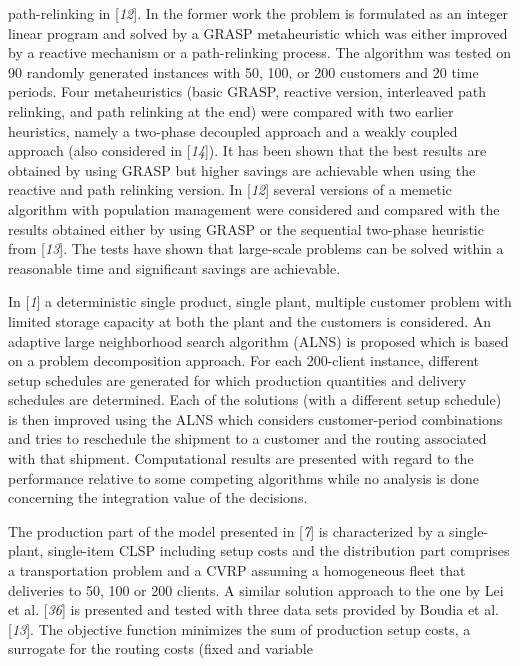  path-relinking in [\textit{12}]. In the former work the
 problem is formulated as an integer linear program and solved by a GRASP
 metaheuristic which was either improved by a reactive mechanism or a path-relinking
 process. The algorithm was tested on 90 randomly generated instances with 50, 100, or
 200 customers and 20 time periods. Four metaheuristics (basic GRASP, reactive
 version, interleaved path relinking, and path relinking at the end) were compared
 with two earlier heuristics, namely a two-phase decoupled approach and a weakly
 coupled approach (also considered in [\textit{14}]). It
 has been shown that the best results are obtained by using GRASP but higher savings
 are achievable when using the reactive and path relinking version. In [\textit{12}] several versions of a memetic algorithm with
 population management were considered and compared with the results obtained either
 by using GRASP or the sequential two-phase heuristic from [\textit{13}]. The tests have shown that large-scale problems can be solved
 within a reasonable time and significant savings are achievable.\par In [\textit{1}] a deterministic single product, single
 plant, multiple customer problem with limited storage capacity at both the plant and
 the customers is considered. An adaptive large neighborhood search algorithm (ALNS)
 is proposed which is based on a problem decomposition approach. For each 200-client
 instance, different setup schedules are generated for which production quantities and
 delivery schedules are determined. Each of the solutions (with a different setup
 schedule) is then improved using the ALNS which considers customer-period
 combinations and tries to reschedule the shipment to a customer and the routing
 associated with that shipment. Computational results are presented with regard to the
 performance relative to some competing algorithms while no analysis is done
 concerning the integration value of the decisions.\par The production part of the model presented in [\textit{7}] is characterized by a single-plant, single-item CLSP including setup
 costs and the distribution part comprises a transportation problem and a CVRP
 assuming a homogeneous fleet that deliveries to 50, 100 or 200 clients. A similar
 solution approach to the one by Lei et al. [\textit{36}] is presented and tested with three data sets provided by Boudia et al.
 [\textit{13}]. The objective function minimizes the
 sum of production setup costs, a surrogate for the routing costs (fixed and variable
